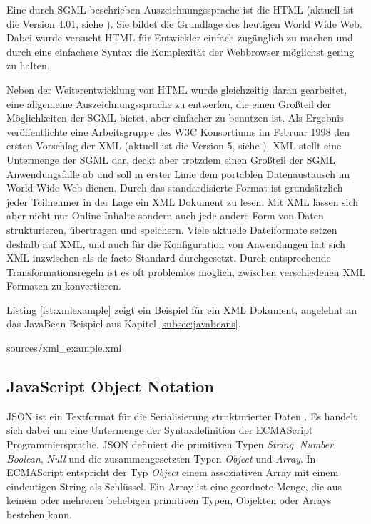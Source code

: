 Eine durch \ac{SGML} beschrieben Auszeichnungssprache ist die \ac{HTML}
(aktuell ist die Version 4.01, siehe \cite{Jacobs:1999}). Sie bildet die Grundlage des
heutigen World Wide Web. Dabei wurde versucht \ac{HTML} für Entwickler einfach
zugänglich zu machen und durch eine einfachere Syntax die Komplexität der
Webbrowser möglichst gering zu halten.

Neben der Weiterentwicklung von \ac{HTML} wurde gleichzeitig daran gearbeitet,
eine allgemeine Auszeichnungssprache zu entwerfen, die einen Großteil der
Möglichkeiten der \ac{SGML} bietet, aber einfacher zu benutzen ist. Als
Ergebnis veröffentlichte eine Arbeitsgruppe des W3C Konsortiums im Februar 1998
den ersten Vorschlag der \ac{XML} (aktuell ist die Version 5, siehe
\cite{bray:2008}). \ac{XML} stellt eine Untermenge der \ac{SGML} dar, deckt aber
trotzdem einen Großteil der \ac{SGML} Anwendungsfälle ab und soll in erster Linie
dem portablen Datenaustausch im World Wide Web dienen. Durch das standardisierte
Format ist grundsätzlich jeder Teilnehmer in der Lage ein \ac{XML} Dokument zu
lesen. Mit \ac{XML} lassen sich aber nicht nur Online Inhalte sondern auch jede
andere Form von Daten strukturieren, übertragen und speichern. Viele aktuelle
Dateiformate setzen deshalb auf \ac{XML}, und auch für die Konfiguration von
Anwendungen hat sich \ac{XML} inzwischen als de facto Standard durchgesetzt.
Durch entsprechende Transformationsregeln ist es oft problemlos möglich,
zwischen verschiedenen \ac{XML} Formaten zu konvertieren.

Listing \ref{lst:xmlexample} zeigt ein Beispiel für ein \ac{XML} Dokument,
angelehnt an das JavaBean Beispiel aus Kapitel \ref{subsec:javabeans}.

\pagebreak
\lstset{language=XML}

{sources/xml_example.xml}

\subsection{JavaScript Object Notation}
\ac{JSON} ist ein Textformat für die Serialisierung strukturierter Daten
\cite{rfc4627}. Es handelt sich dabei um eine Untermenge der Syntaxdefinition der
ECMAScript Programmiersprache. \ac{JSON} definiert die primitiven
Typen \emph{String}, \emph{Number}, \emph{Boolean}, \emph{Null} und die
zusammengesetzten Typen \emph{Object} und \emph{Array}. In ECMAScript entspricht
der Typ \emph{Object} einem assoziativen Array mit einem eindeutigen String als
Schlüssel. Ein Array ist eine geordnete Menge, die aus keinem oder mehreren
beliebigen primitiven Typen, Objekten oder Arrays bestehen kann.

